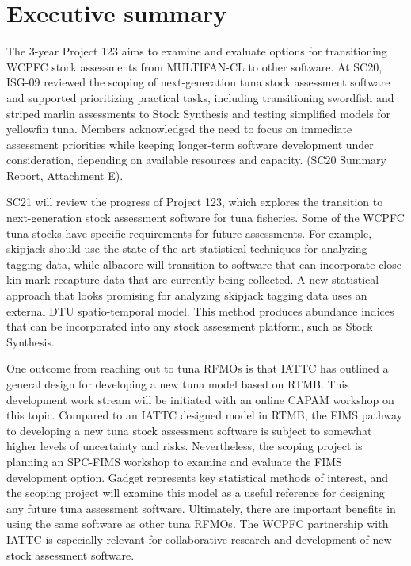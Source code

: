 \documentclass{SCreport}
\begin{document}
\wcpfctitlepage

\tableofcontents
\newpage

\section{Executive summary}

\vspace{-1ex}

The 3-year Project 123 aims to examine and evaluate options for transitioning
WCPFC stock assessments from MULTIFAN-CL to other software. At SC20, ISG-09
reviewed the scoping of next-generation tuna stock assessment software and
supported prioritizing practical tasks, including transitioning swordfish and
striped marlin assessments to Stock Synthesis and testing simplified models for
yellowfin tuna. Members acknowledged the need to focus on immediate assessment
priorities while keeping longer-term software development under consideration,
depending on available resources and capacity. (SC20 Summary Report, Attachment
E).

SC21 will review the progress of Project 123, which explores the transition to
next-generation stock assessment software for tuna fisheries. Some of the WCPFC
tuna stocks have specific requirements for future assessments. For example,
skipjack should use the state-of-the-art statistical techniques for analyzing
tagging data, while albacore will transition to software that can incorporate
\mbox{close-kin} mark-recapture data that are currently being collected. A new
statistical approach that looks promising for analyzing skipjack tagging data
uses an external DTU spatio-temporal model. This method produces abundance
indices that can be incorporated into any stock assessment platform, such as
Stock Synthesis.

One outcome from reaching out to tuna RFMOs is that IATTC has outlined a general
design for developing a new tuna model based on RTMB. This development work
stream will be initiated with an online CAPAM workshop on this topic. Compared
to an IATTC designed model in RTMB, the FIMS pathway to developing a new tuna
stock assessment software is subject to somewhat higher levels of uncertainty
and risks. Nevertheless, the scoping project is planning an \mbox{SPC-FIMS}
workshop to examine and evaluate the FIMS development option. Gadget represents
key statistical methods of interest, and the scoping project will examine this
model as a useful reference for designing any future tuna assessment software.
Ultimately, there are important benefits in using the same software as other
tuna RFMOs. The WCPFC partnership with IATTC is especially relevant for
collaborative research and development of new stock assessment software.
\end{document}

